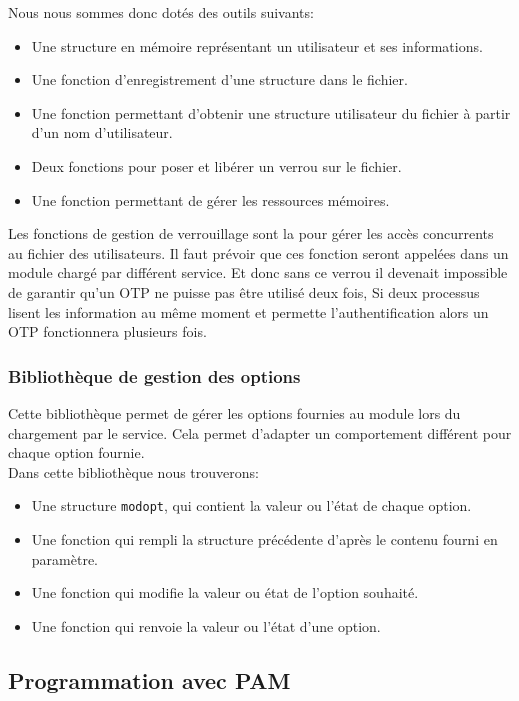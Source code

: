 Nous nous sommes donc dotés des outils suivants:
\begin{itemize}
  \item Une structure en mémoire représentant un utilisateur et ses
  informations.
  \item Une fonction d'enregistrement d'une structure dans le fichier.
  \item Une fonction permettant d'obtenir une structure utilisateur du fichier
  à partir d'un nom d'utilisateur.
  \item Deux fonctions pour poser et libérer un verrou sur le fichier.
  \item Une fonction permettant de gérer les ressources mémoires.\\
\end{itemize}

Les fonctions de gestion de verrouillage sont la pour gérer les accès concurrents
au fichier des utilisateurs. Il faut prévoir que ces fonction seront appelées
dans un module chargé par différent service. Et donc sans ce verrou il devenait
impossible de garantir qu'un OTP ne puisse pas être utilisé deux fois, Si deux
processus lisent les information au même moment et permette l'authentification
alors un OTP fonctionnera plusieurs fois.

\subsubsection{Bibliothèque de gestion des options}
Cette bibliothèque permet de gérer les options fournies au module lors du chargement
par le service. Cela permet d'adapter un comportement différent pour chaque option fournie.\\
Dans cette bibliothèque nous trouverons:
\begin{itemize}
  \item Une structure \verb?modopt?, qui contient la valeur ou l'état de chaque option.
  \item Une fonction qui rempli la structure précédente d'après le contenu fourni en paramètre.
  \item Une fonction qui modifie la valeur ou état de l'option souhaité.
  \item Une fonction qui renvoie la valeur ou l'état d'une option.
\end{itemize}

\subsection{Programmation avec PAM}
